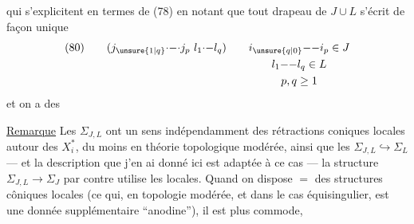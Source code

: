 
qui s'explicitent en termes de (78) en notant que tout drapeau de $J\cup L$  s'écrit de façon unique
\[
(80)\qquad(j_{\unsure{1|q}}\mathord{\cdot}\mathord{-}\mathord{\cdot}j_p\ l_1\mathord{\cdot}\mathord{-}l_q)\qquad
\begin{gathered}[t]
i_{\unsure{q|0}}\mathord{-}\mathord{-}i_p\in J\\
l_1\mathord{-}\mathord{-}l_q\in L\\
p,q\geq1
\end{gathered}
\]
et  on a des

\uline{Remarque} Les $\Sigma_{J,L}$ ont un sens  indépendamment des rétractions coniques locales autour des $X_i^*$, du moins en théorie topologique modérée, ainsi que les $\Sigma_{J,L}\hookrightarrow\Sigma_L$ --- et la description que j'en ai donné ici est adaptée à ce cas --- la structure $\Sigma_{J,L}\to\Sigma_J$ par contre utilise les     locales. Quand on dispose $=$ des structures côniques locales (ce qui, en topologie modérée, et dans le cas équisingulier, est une donnée supplémentaire ``anodine''), il est plus commode,
